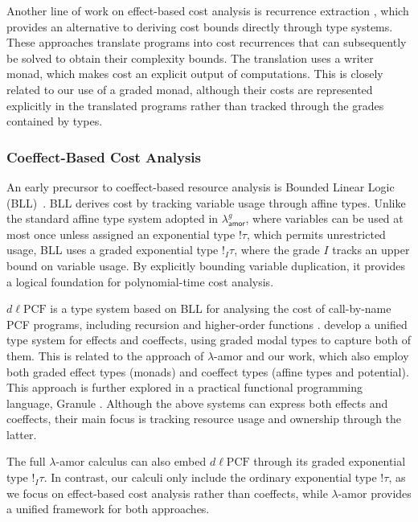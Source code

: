 Another line of work on effect-based cost analysis is recurrence extraction \citep{dannerDenotationalCostSemantics2015,kavvosRecurrenceExtractionFunctional2020,cutlerDenotationalRecurrenceExtraction2020}, 
which provides an alternative to deriving cost bounds directly through type systems. 
These approaches translate programs into cost recurrences that can subsequently be solved to obtain their complexity bounds. 
The translation uses a writer monad, which makes cost an explicit output of computations. 
This is closely related to our use of a graded monad,  
although their costs are represented explicitly in the translated programs rather than tracked through the grades contained by types.

\subsubsection{Coeffect-Based Cost Analysis}
An early precursor to coeffect-based resource analysis is Bounded Linear Logic (BLL)~\citep{girardSS92}.
BLL derives cost by tracking variable usage through affine types. Unlike the standard affine type system adopted in $\lambda^g_{\mathsf{amor}}$, where variables can be used at most once unless assigned an exponential type 
$!\tau$, which permits unrestricted usage, BLL uses a graded exponential type $!_I\tau$, where the grade $I$ tracks an upper bound on variable usage. 
By explicitly bounding variable duplication, it provides a logical foundation for polynomial-time cost analysis.

$d\ell\mathrm{PCF}$ \citep{dallagoLinearDependentTypes2011a} is a type system based on BLL for analysing the cost of 
call-by-name PCF programs, including recursion and higher-order functions \citep{Plotkin77}.
\cite{gaboardiCombiningEffectsCoeffects2016} develop a unified type system for effects and coeffects, using graded modal types to capture both of them.
This is related to the approach of $\lambda$-amor and our work, which also employ both graded effect types (monads) and coeffect types (affine types and potential).
This approach is further explored in a practical functional programming language, Granule \citep{orchardQuantitativeProgramReasoning2019a}. Although the above systems can express both 
effects and coeffects, their main focus is tracking resource usage and ownership through the latter.

The full $\lambda$-amor calculus can also embed $d\ell\mathrm{PCF}$ through its graded exponential type $!_{I}\tau$. 
In contrast, our calculi only include the ordinary exponential type $!\tau$, 
as we focus on effect-based cost analysis rather than coeffects, while $\lambda$-amor provides a unified framework for both approaches.

